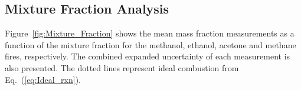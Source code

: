 \documentclass[preprint,review,12pt]{elsarticle}
\begin{document}
\subsection{Mixture Fraction Analysis}
\label{ssec:Mixture_Faction_Analysis}
Figure~\ref{fig:Mixture_Fraction} shows the mean mass fraction measurements as a function of the mixture fraction for the methanol, ethanol, acetone and methane fires, respectively. The combined expanded uncertainty of each measurement is also presented. The dotted lines represent ideal combustion from Eq.~(\ref{eq:Ideal_rxn}).
\end{document}
